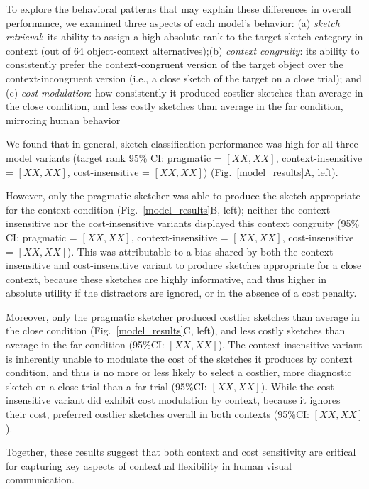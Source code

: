 \documentclass[9pt,twocolumn,twoside]{pnas-new}
\begin{document}
To explore the behavioral patterns that may explain these differences in overall performance, we examined three aspects of each model's behavior: (a) \textit{sketch retrieval}: its ability to assign a high absolute rank to the target sketch category in context (out of 64 object-context alternatives);(b) \textit{context congruity}: its ability to consistently prefer the context-congruent version of the target object over the context-incongruent version (i.e., a close sketch of the target on a close trial); and (c) \textit{cost modulation}: how consistently it produced costlier sketches than average in the close condition, and less costly sketches than average in the far condition, mirroring human behavior

We found that in general, sketch classification performance was high for all three model variants (target rank 95\% CI: pragmatic = $[XX,XX]$, context-insensitive = $[XX,XX]$, cost-insensitive = $[XX,XX]$) (Fig.~\ref{model_results}A, left).

However, only the pragmatic sketcher was able to produce the sketch appropriate for the context condition (Fig.~\ref{model_results}B, left); neither the context-insensitive nor the cost-insensitive variants displayed this context congruity (95\% CI: pragmatic = $[XX,XX]$, context-insensitive = $[XX,XX]$, cost-insensitive = $[XX,XX]$). 
This was attributable to a bias shared by both the context-insensitive and cost-insensitive variant to produce sketches appropriate for a close context, because these sketches are highly informative, and thus higher in absolute utility if the distractors are ignored, or in the absence of a cost penalty. 

Moreover, only the pragmatic sketcher produced costlier sketches than average in the close condition (Fig.~\ref{model_results}C, left), and less costly sketches than average in the far condition (95\%CI: $[XX,XX]$). The context-insensitive variant is inherently unable to modulate the cost of the sketches it produces by context condition, and thus is no more or less likely to select a costlier, more diagnostic sketch on a close trial than a far trial (95\%CI: $[XX,XX]$). While the cost-insensitive variant did exhibit cost modulation by context, because it ignores their cost, preferred costlier sketches overall in both contexts (95\%CI: $[XX,XX]$). 

Together, these results suggest that both context and cost sensitivity are critical for capturing key aspects of contextual flexibility in human visual communication. 
\end{document}
